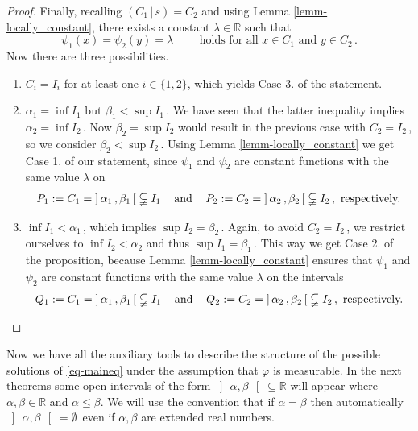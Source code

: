 \documentclass[12pt]{amsart}
\theoremstyle{remark}
\theoremstyle{definition}
\newcommand{\RR}{\mathbb{R}}
\newcommand{\RRx}{\overline{\mathbb{R}}}
\newcommand{\rfl}[2]{\left( #1 \, \vert \, #2 \right)}
\begin{document}
\begin{proof}
Finally, recalling 
$ \rfl{C_1}{s} = C_2 $ and using 
Lemma \ref{lemm-locally_constant}, 
there exists a constant $ \lambda \in \RR $ 
such that 
\[
\psi_1(x) = \psi_2(y) = \lambda
\qquad \mbox{ holds for all } 
x \in C_1 \mbox{ and } y \in C_2 \,. 
\]
Now there are three possibilities. 
\begin{enumerate}
\item[(i)] 
$ C_i = I_i $ for at least one 
$ i \in \lbrace 1,2 \rbrace $, 
which yields Case 3. of the statement. 
\item[(ii)] 
$ \alpha_1 = \inf I_1 $ but 
$ \beta_1 < \sup I_1 \,$. 
We have seen that the latter inequality implies 
$ \alpha_2 = \inf I_2 \,$. 
Now $ \beta_2 = \sup I_2 $ would 
result in the previous case with 
$ C_2 = I_2 \,$, so we consider 
$ \beta_2 < \sup I_2 \,$. 
Using Lemma \ref{lemm-locally_constant} 
we get Case 1. of our statement, 
since $ \psi_1 $ and $ \psi_2 $ 
are constant functions with the same value 
$ \lambda $ on 
\[
P_1 := C_1 = \left] \, \alpha_1 \,, \beta_1 \, \right[ 
\subsetneqq I_1 
\hspace{3mm} \mbox{ and } \hspace{3mm} 
P_2 := C_2 = \left] \, \alpha_2 \,, \beta_2 \, \right[ 
\subsetneqq I_2 \,, 
\mbox{ respectively.}
\] 
\item[(iii)] 
$ \inf I_1 < \alpha_1 \,$, which implies 
$ \sup I_2 = \beta_2 \,$. 
Again, to avoid $ C_2 = I_2 \,$, 
we restrict ourselves to 
$ \inf I_2 < \alpha_2 $ and thus 
$ \sup I_1 = \beta_1 \,$. 
This way we get Case 2. of the proposition, 
because Lemma \ref{lemm-locally_constant} 
ensures that 
$ \psi_1 $ and $ \psi_2 $ 
are constant functions with the same value 
$ \lambda $ on the intervals 
\[
Q_1 := C_1 = \left] \, \alpha_1 \,, \beta_1 \, \right[ 
\subsetneqq I_1 
\hspace{3mm} \mbox{ and } \hspace{3mm} 
Q_2 := C_2 = \left] \, \alpha_2 \,, \beta_2 \, \right[ 
\subsetneqq I_2 \,, 
\mbox{ respectively.} 
\]
\end{enumerate}
\end{proof}

Now we have all the auxiliary tools to describe the 
structure of the possible solutions of \eqref{eq-maineq} 
under the assumption that $\varphi$ is measurable. 
In the next theorems some open intervals of the form 
$ \left] \, \alpha , \beta \, \right[ \subseteq \RR $ 
will appear where 
$ \alpha, \beta \in \RRx $ and $ \alpha \leq \beta $. 
We will use the convention that if 
$ \alpha = \beta $ then automatically 
$ \left] \, \alpha , \beta \, \right[ = \emptyset \,$ 
even if $ \alpha, \beta $ are extended real numbers. 
\end{document}
